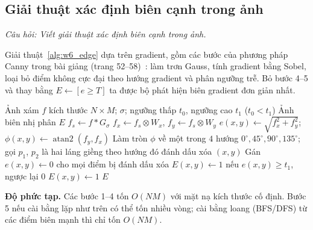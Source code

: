\subsection{Giải thuật xác định biên cạnh trong ảnh}
\label{subsec:w6_edge_algorithm}

\textit{Câu hỏi: Viết giải thuật xác định biên cạnh trong ảnh.}

Giải thuật~\ref{alg:w6_edge} dựa trên gradient, gồm các bước của phương pháp Canny trong bài giảng (trang 52--58)~\citep{xlav_lec6,canny1986computational}: làm trơn Gauss, tính gradient bằng Sobel, loại bỏ điểm không cực đại theo hướng gradient và phân ngưỡng trễ. Bỏ bước 4--5 và thay bằng $E \gets [e \ge T]$ ta được bộ phát hiện biên gradient đơn giản nhất.

\begin{algorithm}[ht]
\caption{Phát hiện biên cạnh dựa trên gradient}
\label{alg:w6_edge}
\begin{algorithmic}[1]
\Require Ảnh xám $f$ kích thước $N \times M$; $\sigma$; ngưỡng thấp $t_0$, ngưỡng cao $t_1$ ($t_0 < t_1$)
\Ensure Ảnh biên nhị phân $E$
\State $f_s \gets f * G_\sigma$ 
\State $f_x \gets f_s \otimes W_x$, \quad $f_y \gets f_s \otimes W_y$ 
    \State $e(x, y) \gets \sqrt{f_x^2 + f_y^2}$; \quad $\phi(x, y) \gets \operatorname{atan2}(f_y, f_x)$
\EndFor
{} 
    \State Làm tròn $\phi$ về một trong $4$ hướng $0^\circ, 45^\circ, 90^\circ, 135^\circ$; gọi $p_1$, $p_2$ là hai láng giềng theo hướng đó
     \State đánh dấu xóa $(x, y)$ \EndIf
\EndFor
\State Gán $e(x, y) \gets 0$ cho mọi điểm bị đánh dấu xóa
\State $E(x, y) \gets 1$ nếu $e(x, y) \ge t_1$, ngược lại $0$ 
\Repeat {}
         \State $E(x, y) \gets 1$ \EndIf
    \EndFor
{}
\State \Return $E$
\end{algorithmic}
\end{algorithm}

\textbf{Độ phức tạp.} Các bước 1--4 tốn $O(NM)$ với mặt nạ kích thước cố định. Bước 5 nếu cài bằng lặp như trên có thể tốn nhiều vòng; cài bằng loang (BFS/DFS) từ các điểm biên mạnh thì chỉ tốn $O(NM)$.

